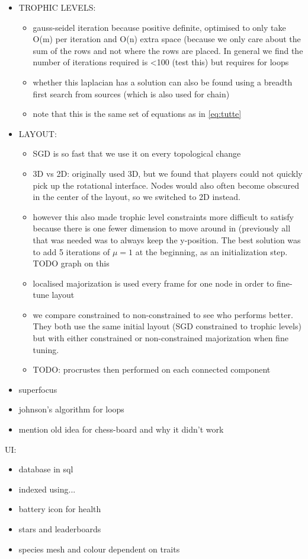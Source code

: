 \begin{itemize}
    \item TROPHIC LEVELS:
    \begin{itemize}
        \item gauss-seidel iteration because positive definite, optimised to only take O(m) per iteration and O(n) extra space (because we only care about the sum of the rows and not where the rows are placed. In general we find the number of iterations required is <100 (test this) but requires for loops~\cite{oliviasimpsonpaper}
        \item whether this laplacian has a solution can also be found using a breadth first search from sources (which is also used for chain)
        \item note that this is the same set of equations as in \eqref{eq:tutte}
    \end{itemize}
    \item LAYOUT:
    \begin{itemize}
        \item SGD is so fast that we use it on every topological change
        \item 3D vs 2D: originally used 3D, but we found that players could not quickly pick up the rotational interface. Nodes would also often become obscured in the center of the layout, so we switched to 2D instead. 
        \item however this also made trophic level constraints more difficult to satisfy because there is one fewer dimension to move around in (previously all that was needed was to always keep the y-position. The best solution was to add 5 iterations of $\mu=1$ at the beginning, as an initialization step. TODO graph on this
        \item localised majorization is used every frame for one node in order to fine-tune layout
        \item we compare constrained to non-constrained to see who performs better. They both use the same initial layout (SGD constrained to trophic levels) but with either constrained or non-constrained majorization when fine tuning.
        \item TODO: procrustes then performed on each connected component
    \end{itemize}
    
    \item superfocus
    \item johnson's algorithm for loops
    \item mention old idea for chess-board and why it didn't work
\end{itemize}
UI:
\begin{itemize}
    \item database in sql
    \item indexed using...
    \item battery icon for health
    \item stars and leaderboards
    \item species mesh and colour dependent on traits
\end{itemize}


